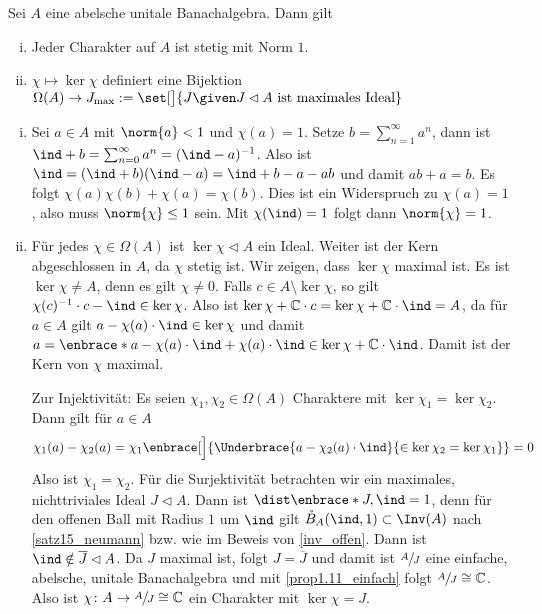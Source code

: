 \begin{satz}[label=satz:1.13,{name=[Stetigkeit von Charakteren, Zusammenhang mit maximalen Idealen]}]
	Sei $A$ eine abelsche unitale Banachalgebra. Dann gilt
	\begin{enumerate}[(i),itemsep=0pt]
		\item Jeder Charakter auf $A$ ist stetig mit Norm $1$.
		\item $\chi \mapsto \ker \chi$ definiert eine Bijektion  
		\(
			\Omega(A) \to J_{\max} := \set[\big]{J \given J \lhd A \text{ ist maximales Ideal} }
		\)
	\end{enumerate}
\end{satz}
\begin{beweis} \leavevmode
	\begin{enumerate}[(i)]
		\item Sei $a \in A$ mit $\norm{a}<1$ und $\chi(a)=1$. 
		Setze $b= \sum_{n=1}^{\infty} a^n$, dann ist $\ind + b = \sum_{n=0}^{\infty} a^n = (\ind-a)^{-1}$. 
		Also ist $\ind = (\ind+b)(\ind-a) = \ind + b -a -ab$ und damit $ab+a=b$. 
		Es folgt $\chi(a)\chi(b) + \chi(a)= \chi(b)$. 
		Dies ist ein Widerspruch zu $\chi(a)=1$, also muss $\norm{\chi}\le 1$ sein. 
		Mit $\chi(\ind)=1$ folgt dann $\norm{\chi}=1$. 
		\item Für jedes $\chi \in \Omega(A)$ ist $\ker \chi \lhd A$ ein Ideal. 
		Weiter ist der Kern abgeschlossen in $A$, da $\chi$ stetig ist. 
		Wir zeigen, dass $\ker \chi$ maximal ist. 
		Es ist $\ker \chi \neq A$, denn es gilt $\chi \neq 0$. 
		Falls $c \in A \setminus \ker \chi$, so gilt 
		\(
			\chi(c)^{-1} \cdot c-\ind \in \ker \chi
		\).
		Also ist $\ker \chi + \mathbb{C} \cdot c = \ker \chi + \mathbb{C} \cdot \ind=A$, da für $a \in A$ gilt $a- \chi(a) \cdot \ind \in \ker \chi$ und damit 
		$a= \enbrace*{a- \chi(a) \cdot \ind}+ \chi(a) \cdot \ind \in \ker \chi + \mathbb{C} \cdot \ind$. 
		Damit ist der Kern von $\chi$ maximal.
		
		Zur Injektivität: Es seien $\chi_1, \chi_2 \in \Omega(A)$ Charaktere mit $\ker \chi_1 = \ker \chi_2$. Dann gilt für $a \in A$
		\begin{align}
			\chi_1(a) - \chi_2(a) = \chi_1 \enbrace[\Big]{\Underbrace{a - \chi_2(a) \cdot \ind}{\in \ker \chi_2=\ker \chi_1}} = 0
		\end{align}
		Also ist $\chi_1=\chi_2$. Für die Surjektivität betrachten wir ein maximales, nichttriviales Ideal $J \lhd A$. 
		Dann ist $\dist \enbrace*{J,\ind}=1$, denn für den offenen Ball mit Radius $1$ um $\ind$ gilt $\mathring{B}_A(\ind,1) \subset \Inv(A)$ nach \autoref{satz15_neumann} bzw. wie im Beweis von \autoref{inv_offen}. 
		Dann ist $\ind \notin \overline{J} \lhd A$. 
		Da $J$ maximal ist, folgt $J=\overline{J}$ und damit ist 
		$\sfrac{A}{J}$ eine einfache, abelsche, unitale Banachalgebra und mit \autoref{prop1.11_einfach} folgt $\sfrac{A}{J} \cong \mathbb{C}$. Also ist 
		$\chi \colon A \to \sfrac{A}{J} \cong \mathbb{C}$ ein Charakter mit $\ker \chi= J$. \qedhere
	\end{enumerate}
\end{beweis}


